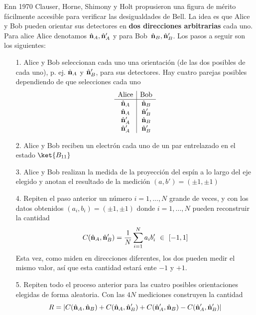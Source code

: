 \documentclass[a4paper,11pt]{book} %
\numberwithin{equation}{chapter}
\begin{document}
Enn 1970 Clauser, Horne, Shimony y Holt \cite{bib_Bell_CHSH} propusieron una figura de mérito fácilmente accesible para verificar las desigualdades de Bell. La idea es que Alice y Bob pueden orientar sus detectores en \textbf{dos direcciones  arbitrarias} cada uno. Para alice Alice denotamos $\hat{\bf n}_A, \hat{\bf n}'_A$  y  para Bob $\, \hat{\bf n}_B, \hat{\bf n}'_B$. Los pasos a seguir son los siguientes:
\begin{itemize}
	\item[1.] Alice y Bob seleccionan cada uno una orientación (de las dos posibles de cada uno), p. ej.  $\hat{\bf n}_A$ y $\hat{\bf n}'_B$, para sus detectores. 
	Hay cuatro parejas posibles dependiendo de que selecciones cada uno
	\begin{equation}
	\begin{array}{c|c} {\rm Alice} & {\rm Bob} \\ 
	\hline \hat{\bf n}_A  &  \hat{\bf n}_B     \\ 
	\hat{\bf n}_A         &  \hat{\bf n}'_B    \\ 
	\hat{\bf n}'_A        &  \hat{\bf n}_B     \\ 
	\hat{\bf n}'_A        &  \hat{\bf n}'_B \end{array}
	\end{equation}

	\item[2.] Alice y Bob reciben un electrón cada uno de un par entrelazado en el estado $\ket{B_{11}}$

	\item[3.] Alice y Bob realizan la medida de la proyección del espín a lo largo del eje elegido y anotan el resultado de la medición $(a,b')=(\pm 1, \pm 1)$
	
	\item[4.] Repiten el paso anterior un número $i=1,..., N$ grande de veces, y con los datos obtenidos $(a_i,b_i)=(\pm 1, \pm 1)$
donde $i=1,...,N$ pueden reconstruir la cantidad
	\begin{equation}
	 C(\hat{\bf n}_A, \hat{\bf n}'_B) = \frac{1}{N}\sum_{i=1}^N a_i b'_i ~\in~  [-1,1]
	\end{equation}
Esta vez, como miden en direcciones diferentes, los dos pueden medir el mismo valor, así que esta cantidad estará ente $-1$ y $+1$.

	\item[5.] Repiten todo el proceso anterior para las cuatro posibles orientaciones elegidas de forma aleatoria. Con las  $4N$ mediciones construyen la cantidad
	\begin{equation} \label{ec_entrelazamiento_bell_R}
	R = | C(\hat{\bf n}_A, \hat{\bf n}_B) +  C(\hat{\bf n}_A, \hat{\bf n}'_B) +  C(\hat{\bf n}'_A, \hat{\bf n}_B)-  
	C(\hat{\bf n}'_A, \hat{\bf n}'_B)|
	\end{equation}

\end{itemize}
\end{document}
